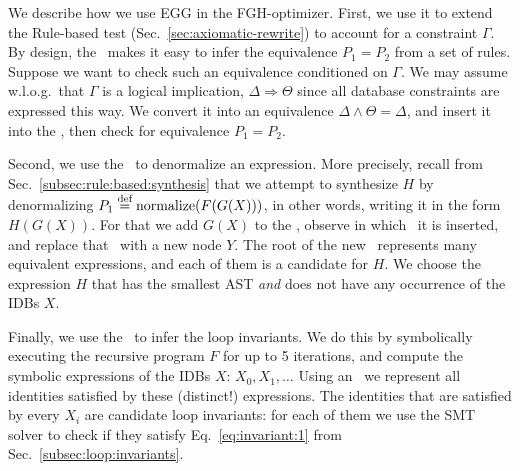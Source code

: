 
We describe how we use EGG in the FGH-optimizer.  First, we use it to
extend the Rule-based test (Sec.~\ref{sec:axiomatic-rewrite}) to
account for a constraint $\Gamma$.  By design, the \egraph\ makes it
easy to infer the equivalence $P_1 = P_2$ from a set of rules.
Suppose we want to check such an equivalence conditioned on $\Gamma$.
We may assume w.l.o.g.\ that $\Gamma$ is a logical implication,
$\Delta \Rightarrow \Theta$ since all database constraints are
expressed this way.  We convert it into an equivalence
$\Delta \wedge \Theta = \Delta$, and insert it into the \egraph, then
check for equivalence $P_1 = P_2$.

Second, we use the \egraph\ to denormalize an expression.  More
precisely, recall from Sec.~\ref{subsec:rule:based:synthesis} that we
attempt to synthesize $H$ by denormalizing
$P_1 \stackrel{\text{def}}{=} \text{normalize}(F(G(X)))$, in other words, writing it in
the form $H(G(X))$.  For that we add $G(X)$ to the \egraph, observe in
which \eclass\ it is inserted, and replace that \eclass\ with a new
node $Y$.  The root of the new \egraph\ represents many equivalent
expressions, and each of them is a candidate for $H$.  We choose the
expression $H$ that has the smallest AST {\em and} does not have any
occurrence of the IDBs $X$.

Finally, we use the \egraph\ to infer the loop invariants.  We do this
by symbolically executing the recursive program $F$ for up to 5
iterations, and compute the symbolic expressions of the IDBs $X$:
$X_0, X_1, \ldots$  Using an \egraph\ we represent all identities
satisfied by these (distinct!) expressions.  The identities that are
satisfied by every $X_i$ are candidate loop invariants: for each of
them we use the SMT solver to check if they satisfy
Eq.~\eqref{eq:invariant:1} from 
Sec.~\ref{subsec:loop:invariants}.


